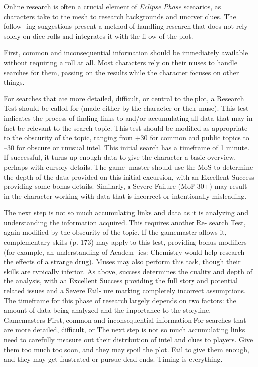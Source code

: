 Online research is often a crucial element of \textit{Eclipse }
\textit{Phase} scenarios, as characters take to the mesh to 
research backgrounds and uncover clues. The follow-
ing suggestions present a method of handling research 
that does not rely solely on dice rolls and integrates it 
with the fl ow of the plot.

First, common and inconsequential information 
should be immediately available without requiring 
a roll at all. Most characters rely on their muses to 
handle searches for them, passing on the results while 
the character focuses on other things.

For searches that are more detailed, difficult, or 
central to the plot, a Research Test should be called 
for (made either by the character or their muse). 
This test indicates the process of finding links to 
and/or accumulating all data that may in fact be 
relevant to the search topic. This test should be 
modified as appropriate to the obscurity of the topic, 
ranging from +30 for common and public topics 
to –30 for obscure or unusual intel. This initial 
search has a timeframe of 1 minute. If successful, it 
turns up enough data to give the character a basic 
overview, perhaps with cursory details. The game-
master should use the MoS to determine the depth 
of the data provided on this initial excursion, with 
an Excellent Success providing some bonus details. 
Similarly, a Severe Failure (MoF 30+) may result in 
the character working with data that is incorrect or 
intentionally misleading.

The next step is not so much accumulating links 
and data as it is analyzing and understanding the 
information acquired. This requires another Re-
search Test, again modified by the obscurity of the 
topic. If the gamemaster allows it, complementary 
skills (p. 173) may apply to this test, providing bonus 
modifiers (for example, an understanding of Academ-
ics: Chemistry would help research the effects of a 
strange drug). Muses may also perform this task, 
though their skills are typically inferior. As above, 
success determines the quality and depth of the 
analysis, with an Excellent Success providing the full 
story and potential related issues and a Severe Fail-
ure marking completely incorrect assumptions. The 
timeframe for this phase of research largely depends 
on two factors: the amount of data being analyzed 
and the importance to the storyline. Gamemasters 
First, common and inconsequential information 
For searches that are more detailed, difficult, or 
The next step is not so much accumulating links 
need to carefully measure out their distribution of 
intel and clues to players. Give them too much too 
soon, and they may spoil the plot. Fail to give them 
enough, and they may get frustrated or pursue dead 
ends. Timing is everything.

